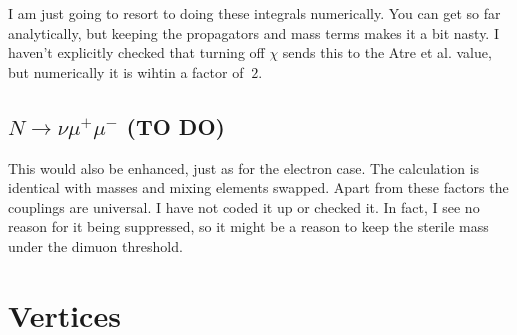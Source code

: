 \documentclass[11pt, a4paper]{article}
\begin{document}
I am just going to resort to doing these integrals numerically. You can get so
far analytically, but keeping the propagators and mass terms makes it a bit
nasty. I haven't explicitly checked that turning off $\chi$ sends this to the
Atre et al. value, but numerically it is wihtin a factor of $~2$. 

\subsection{$N \to \nu \mu^+\mu^-$  (TO DO)}

This would also be enhanced, just as for the electron case. The calculation is
identical with masses and mixing elements swapped. Apart from these factors the
couplings are universal. I have not coded it up or checked it. In fact, I see
no reason for it being suppressed, so it might be a reason to keep the sterile
mass under the dimuon threshold.


\appendix
\newpage
\section{\label{app:vertices}Vertices}
\end{document}
